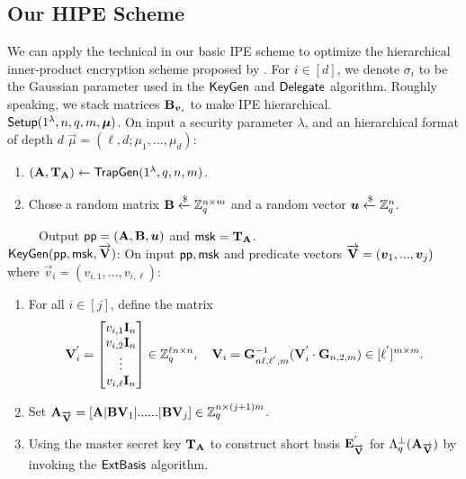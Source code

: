 \documentclass{llncs}
\begin{document}
\begin{appendix}
\subsection{Our HIPE Scheme}
We can apply the technical in our basic IPE scheme to optimize the hierarchical inner-product encryption scheme proposed by \cite{PKC:Xagawa13}.  For $i \in [d]$, we denote $\sigma_{i}$ to be the Gaussian parameter used in the $\mathsf{KeyGen}$ and $\mathsf{Delegate}$ algorithm. Roughly speaking, we stack matrices $\mathbf{B}_{\boldsymbol{v}_{i}}$ to make IPE hierarchical.\\[0.4cm]
$\mathsf{Setup}(1^{\lambda}, n, q, m, \boldsymbol{\mu})$. On input a security parameter $\lambda$, and an hierarchical format of depth $d$ $\vec{\mu}=(\ell,d;\mu_{1},...,\mu_{d})$:
\begin{enumerate}
\item $(\mathbf{A}, \mathbf{T}_{\mathbf{A}})\leftarrow \mathsf{TrapGen}(1^{\lambda}, q, n, m)$.
\item Chose a random matrix $\mathbf{B}\xleftarrow{\$} \mathbb{Z}^{n \times m}_{q}$ and a random vector $\boldsymbol{u}\xleftarrow{\$} \mathbb{Z}^{n}_{q}$.
\end{enumerate}
~~~~~Output $\mathsf{pp}=(\mathbf{A}, \mathbf{B}, \boldsymbol{u})$ and $\mathsf{msk}= \mathbf{T}_{\mathbf{A}}$.\\[0.4cm]
$\mathsf{KeyGen}(\mathsf{pp}, \mathsf{msk}, \overrightarrow{\mathbf{V}})$: On input $\mathsf{pp}, \mathsf{msk}$ and predicate vectors $\overrightarrow{\mathbf{V}}=(\boldsymbol{v}_{1},...,\boldsymbol{v}_{j})$ where $\vec{v}_{i}=(v_{i,1},...,v_{i,\ell})$:
\begin{enumerate}
\item For all $i \in [j]$, define the matrix
\begin{equation}
\mathbf{V}^{'}_{i}= \begin{bmatrix}
v_{i,1} \mathbf{I}_{n}\\
v_{i,2} \mathbf{I}_{n}\\
\vdots\\
v_{i,\ell} \mathbf{I}_{n}
\end{bmatrix} \in \mathbb{Z}^{\ell n \times n}_{q},~~~ \mathbf{V}_{i}=\mathbf{G}^{-1}_{n\ell,\ell^{'},m}(\mathbf{V}^{'}_{i}\cdot \mathbf{G}_{n,2,m}) \in [\ell^{'}]^{m \times m}.
\end{equation}
\item Set  $\mathbf{A}_{\overrightarrow{\mathbf{V}}}=[\mathbf{A} | \mathbf{B}\mathbf{V}_{1}| ...... | \mathbf{B}\mathbf{V}_{j}] \in \mathbb{Z}^{n \times (j+1)m}_{q}$.\\
\item Using the master secret key $\mathbf{T}_{\mathbf{A}}$ to construct short basis $\mathbf{E}^{'}_{\overrightarrow{\mathbf{V}}}$ for  $\Lambda^{\perp}_{q}(\mathbf{A}_{\overrightarrow{\mathbf{V}}})$  by  invoking the $\mathsf{ExtBasis}$ algorithm.\\

\end{enumerate}
\end{appendix}
\end{document}
